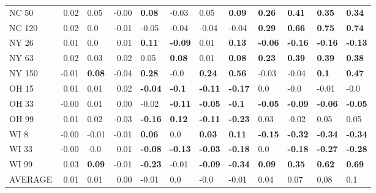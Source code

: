 \begin{tabular}{lrlrllllllll}
NC 50   &     0.02 &           0.05 &    -0.00 &   \textbf{0.08} &                   -0.03 &            0.05 &   \textbf{0.09} &   \textbf{0.26} &   \textbf{0.41} &   \textbf{0.35} &   \textbf{0.34} \\
NC 120  &     0.02 &            0.0 &    -0.01 &           -0.05 &                   -0.04 &           -0.04 &           -0.04 &   \textbf{0.29} &   \textbf{0.66} &   \textbf{0.75} &   \textbf{0.74} \\
NY 26   &     0.01 &            0.0 &     0.01 &   \textbf{0.11} &          \textbf{-0.09} &            0.01 &   \textbf{0.13} &  \textbf{-0.06} &  \textbf{-0.16} &  \textbf{-0.16} &  \textbf{-0.13} \\
NY 63   &     0.02 &           0.03 &     0.02 &            0.05 &           \textbf{0.08} &            0.01 &   \textbf{0.08} &   \textbf{0.23} &   \textbf{0.39} &   \textbf{0.39} &   \textbf{0.38} \\
NY 150  &    -0.01 &  \textbf{0.08} &    -0.04 &   \textbf{0.28} &                    -0.0 &   \textbf{0.24} &   \textbf{0.56} &           -0.03 &           -0.04 &    \textbf{0.1} &   \textbf{0.47} \\
OH 15   &     0.01 &           0.01 &     0.02 &  \textbf{-0.04} &           \textbf{-0.1} &  \textbf{-0.11} &  \textbf{-0.17} &             0.0 &            -0.0 &           -0.01 &            -0.0 \\
OH 33   &    -0.00 &           0.01 &     0.00 &           -0.02 &          \textbf{-0.11} &  \textbf{-0.05} &   \textbf{-0.1} &  \textbf{-0.05} &  \textbf{-0.09} &  \textbf{-0.06} &  \textbf{-0.05} \\
OH 99   &     0.01 &           0.02 &    -0.03 &  \textbf{-0.16} &           \textbf{0.12} &  \textbf{-0.11} &  \textbf{-0.23} &            0.03 &           -0.02 &            0.05 &            0.05 \\
WI 8    &    -0.00 &          -0.01 &    -0.01 &   \textbf{0.06} &                     0.0 &   \textbf{0.03} &   \textbf{0.11} &  \textbf{-0.15} &  \textbf{-0.32} &  \textbf{-0.34} &  \textbf{-0.34} \\
WI 33   &    -0.00 &           -0.0 &     0.01 &  \textbf{-0.08} &          \textbf{-0.13} &  \textbf{-0.03} &  \textbf{-0.18} &             0.0 &  \textbf{-0.18} &  \textbf{-0.27} &  \textbf{-0.28} \\
WI 99   &     0.03 &  \textbf{0.09} &    -0.01 &  \textbf{-0.23} &                   -0.01 &  \textbf{-0.09} &  \textbf{-0.34} &   \textbf{0.09} &   \textbf{0.35} &   \textbf{0.62} &   \textbf{0.69} \\
AVERAGE &     0.01 &           0.01 &     0.00 &           -0.01 &                     0.0 &            -0.0 &           -0.01 &            0.04 &            0.07 &            0.08 &             0.1 \\
\bottomrule
\end{tabular}
